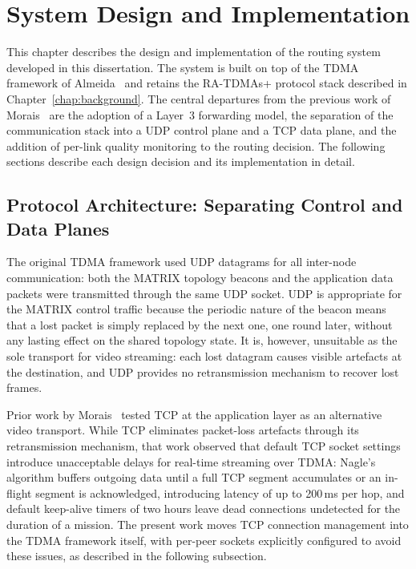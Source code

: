 
\chapter{System Design and Implementation}
\label{chap:implementation}

This chapter describes the design and implementation of the routing system developed in this
dissertation. The system is built on top of the TDMA framework of
Almeida~\cite{almeida2023synchronization} and retains the RA-TDMAs+ protocol stack
described in Chapter~\ref{chap:background}. The central departures from the previous work of
Morais~\cite{morais2024synchronization} are the adoption of a Layer~3 forwarding model, the
separation of the communication stack into a UDP control plane and a TCP data plane, and the
addition of per-link quality monitoring to the routing decision. The following sections describe
each design decision and its implementation in detail.


\section{Protocol Architecture: Separating Control and Data Planes}
\label{sec:proto-split}

The original TDMA framework used UDP datagrams for all inter-node communication:
both the MATRIX topology beacons and the application data packets were transmitted through
the same UDP socket. UDP is appropriate for the MATRIX control traffic because the periodic
nature of the beacon means that a lost packet is simply replaced by the next one, one round
later, without any lasting effect on the shared topology state. It is, however, unsuitable
as the sole transport for video streaming: each lost datagram causes visible artefacts at
the destination, and UDP provides no retransmission mechanism to recover lost frames.

Prior work by Morais~\cite{morais2024synchronization} tested TCP at the application layer
as an alternative video transport. While TCP eliminates packet-loss artefacts through its
retransmission mechanism, that work observed that default TCP socket settings introduce
unacceptable delays for real-time streaming over TDMA: Nagle's algorithm buffers
outgoing data until a full TCP segment accumulates or an in-flight segment is acknowledged,
introducing latency of up to 200\,ms per hop, and default keep-alive timers of two hours
leave dead connections undetected for the duration of a mission. The present work moves TCP
connection management into the TDMA framework itself, with per-peer sockets explicitly
configured to avoid these issues, as described in the following subsection.

